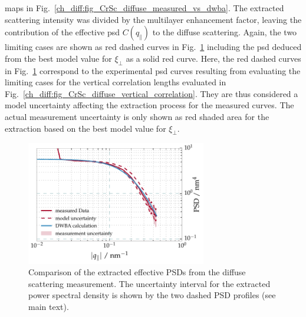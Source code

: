 maps in Fig.~\ref{ch_diff:fig_CrSc_diffuse_measured_vs_dwba}. The extracted scattering intensity was divided by the multilayer 
enhancement factor, leaving the contribution of the effective \gls{psd} $C(q_\parallel)$ to the diffuse scattering. Again, the two limiting cases are shown as red dashed curves in 
Fig.~\ref{ch_diff:fig_CrSc_diffuse_PSD} including the \gls{psd} deduced from the best model 
value for $\xi_\perp$ as a solid red curve. Here, the red dashed curves in Fig.~\ref{ch_diff:fig_CrSc_diffuse_PSD} correspond to the experimental \gls{psd} curves resulting from evaluating the limiting cases for the vertical correlation lengths evaluated in Fig.~\ref{ch_diff:fig_CrSc_diffuse_vertical_correlation}. They are thus considered a model uncertainty affecting the extraction process for the measured curves. The actual measurement uncertainty is only shown as red shaded area for the extraction based on the best model value for $\xi_\perp$.
\begin{figure}[htbp]
  \centering
  \includegraphics[width=0.7\textwidth]{img/CrSc_diffuse_PSD}
  \caption{Comparison of the extracted effective PSDs from the diffuse 
scattering measurement. The 
uncertainty interval for the extracted power spectral density is shown by the 
two dashed PSD profiles (see main text).}
  \label{ch_diff:fig_CrSc_diffuse_PSD}
\end{figure}

